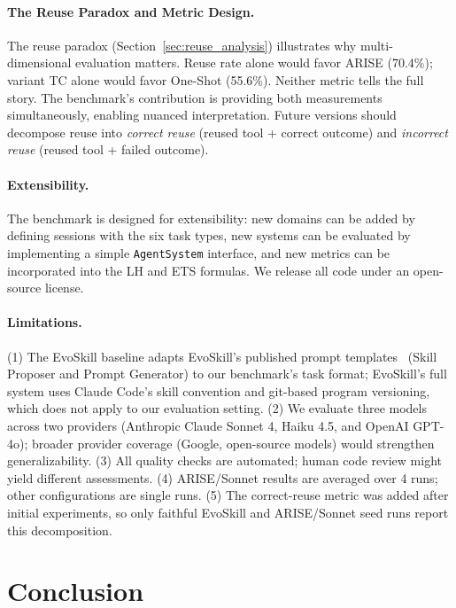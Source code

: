 \documentclass[10pt,twocolumn]{article}
\begin{document}
\paragraph{The Reuse Paradox and Metric Design.} The reuse paradox (Section~\ref{sec:reuse_analysis}) illustrates why multi-dimensional evaluation matters. Reuse rate alone would favor ARISE (70.4\%); variant TC alone would favor One-Shot (55.6\%). Neither metric tells the full story. The benchmark's contribution is providing both measurements simultaneously, enabling nuanced interpretation. Future versions should decompose reuse into \emph{correct reuse} (reused tool + correct outcome) and \emph{incorrect reuse} (reused tool + failed outcome).

\paragraph{Extensibility.} The benchmark is designed for extensibility: new domains can be added by defining sessions with the six task types, new systems can be evaluated by implementing a simple \texttt{AgentSystem} interface, and new metrics can be incorporated into the LH and ETS formulas. We release all code under an open-source license.

\paragraph{Limitations.} (1) The EvoSkill baseline adapts EvoSkill's published prompt templates~\cite{alzubi2026evoskill} (Skill Proposer and Prompt Generator) to our benchmark's task format; EvoSkill's full system uses Claude Code's skill convention and git-based program versioning, which does not apply to our evaluation setting. (2) We evaluate three models across two providers (Anthropic Claude Sonnet 4, Haiku 4.5, and OpenAI GPT-4o); broader provider coverage (Google, open-source models) would strengthen generalizability. (3) All quality checks are automated; human code review might yield different assessments. (4) ARISE/Sonnet results are averaged over 4 runs; other configurations are single runs. (5) The correct-reuse metric was added after initial experiments, so only faithful EvoSkill and ARISE/Sonnet seed runs report this decomposition.

\section{Conclusion}
\end{document}
